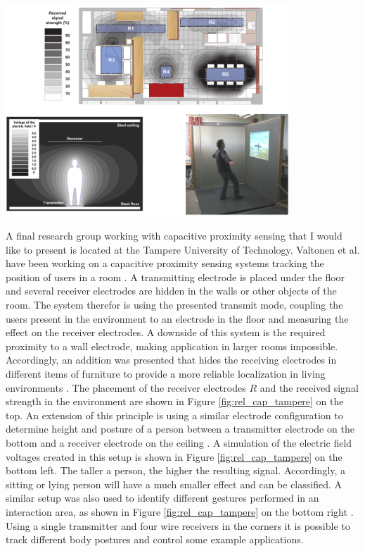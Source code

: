 \begin{minipage}{\linewidth}
\centering
\includegraphics[width=0.8\textwidth]{images/rel_cap_tampere}
\label{fig:rel_cap_tampere}
\end{minipage}

A final research group working with capacitive proximity sensing that I would like to present is located at the Tampere University of Technology. Valtonen et al. have been working on a capacitive proximity sensing systems tracking the position of users in a room \cite{Valtonen2009a,valtonen2012capacitive}. A transmitting electrode is placed under the floor and several receiver electrodes are hidden in the walls or other objects of the room. The system therefor is using the presented transmit mode, coupling the users present in the environment to an electrode in the floor and measuring the effect on the receiver electrodes. A downside of this system is the required proximity to a wall electrode, making application in larger rooms impossible. Accordingly, an addition was presented that hides the receiving electrodes in different items of furniture to provide a more reliable localization in living environments \cite{valtonen2012capacitive}. The placement of the receiver electrodes $R$ and the received signal strength in the environment are shown in Figure \ref{fig:rel_cap_tampere} on the top. An extension of this principle is using a similar electrode configuration to  determine height and posture of a person between a transmitter electrode on the bottom and a receiver electrode on the ceiling \cite{valtonen2011unobtrusive}. A simulation of the electric field voltages created in this setup is shown in Figure \ref{fig:rel_cap_tampere} on the bottom left. The taller a person, the higher the resulting signal. Accordingly, a sitting or lying person will have a much smaller effect and can be classified. A similar setup was also used to identify different gestures performed in an interaction area, as shown in Figure \ref{fig:rel_cap_tampere} on the bottom right \cite{valtonen2010human}. Using a single transmitter and four wire receivers in the corners it is possible to track different body postures and control some example applications.


